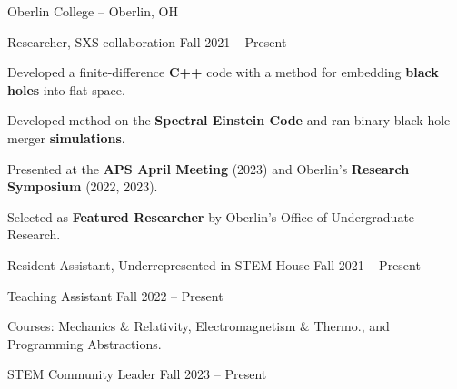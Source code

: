 \begin{entry}{Oberlin College -- Oberlin, OH}

	\entryItem
		{Researcher, SXS collaboration}
		{Fall 2021 -- Present}

		\begin{items}
			\item Developed a finite-difference \textbf{C++} code with a method for embedding \textbf{black holes} into flat space.
			\item Developed method on the \textbf{Spectral Einstein Code} and ran binary black hole merger \textbf{simulations}.
			\item Presented at the \textbf{APS April Meeting} (2023) and Oberlin's \textbf{Research Symposium} (2022, 2023).
			\item Selected as \textbf{Featured Researcher} by Oberlin's Office of Undergraduate Research.
		\end{items}

	\entryItem
		{Resident Assistant, Underrepresented in STEM House}
		{Fall 2021 -- Present}

	\entryItem
		{Teaching Assistant}
		{Fall 2022 -- Present}

		\begin{items}
			\item Courses: Mechanics \& Relativity, Electromagnetism \& Thermo., and Programming Abstractions.
		\end{items}

	\entryItem
		{STEM Community Leader}
		{Fall 2023 -- Present}
	
\end{entry}
